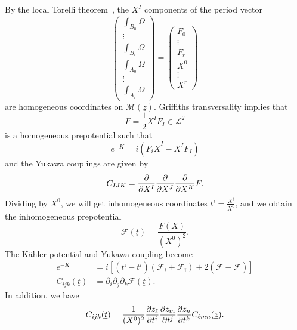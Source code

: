 \documentclass[10pt]{amsart}
\theoremstyle{definition}
\theoremstyle{remark}
\theoremstyle{plain}
\theoremstyle{definition}
\theoremstyle{remark}
\newcommand{\mc}[1]{\mathcal{#1}}
\newcommand{\ut}{\ul{t}}
\newcommand{\uz}{\ul{z}}
\newcommand{\ul}[1]{\underline{#1}}
\newcommand{\1}{\mathbf{1}}
\newcommand{\2}{\mathbf{2}}
\newcommand{\3}{\mathbf{3}}
\begin{document}
By the local Torelli theorem~\cite{periods1,periods2}, the $X^I$ components of the period vector
\[ \begin{pmatrix}
    \int_{B_0} \Omega \\
    \vdots \\
    \int_{B_r} \Omega \\
    \int_{A_0} \Omega \\
    \vdots \\
    \int_{A_r} \Omega
\end{pmatrix} = \begin{pmatrix}
    F_0 \\
    \vdots \\
    F_r \\
    X^0 \\
    \vdots \\
    X^r
\end{pmatrix}
\]
are homogeneous coordinates on $\mc{M}(\uz)$. Griffiths transversality implies that 
\[ F = \frac{1}{2}X^I F_I \in \mc{L}^2 \]
is a homogeneous prepotential such that 
\[ e^{-K} = i (F_i \bar{X}^I - X^I \bar{F}_I) \]
and the Yukawa couplings are given by
\[ C_{IJK} = \pdv{}{X^I}\pdv{}{X^J} \pdv{}{X^K} F. \]
Dividing by $X^0$, we will get inhomogeneous coordinates $t^i = \frac{X^i}{X^0}$, and we obtain the inhomogeneous prepotential
\[ \mc{F}(\ut) = \frac{F(X)}{(X^0)^2}. \]
The K\"ahler potential and Yukawa coupling become
\begin{align*}
    e^{-K} &= i [(t^{\bar{\imath}} - t^i)(\mc{F}_i + \mc{F}_{\bar{\imath}}) + 2 (\mc{F} - \bar{\mc{F}})] \\
    C_{ijk}(\ut) &= \partial_i \partial_j \partial_k \mc{F}(\ut).
\end{align*}
In addition, we have
\[ C_{ijk}(\ut) = \frac{1}{(X^0)^2} \pdv{z_{\ell}}{t^i} \pdv{z_m}{t^j}\pdv{z_n}{t^k} C_{\ell m n} (\uz). \]
\end{document}
